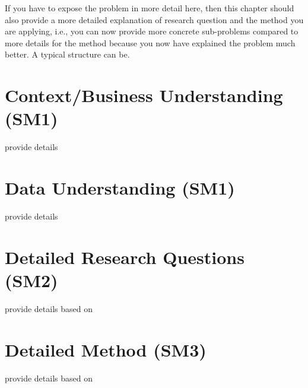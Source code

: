 If you have to expose the problem in more detail here, then this chapter should also provide a more detailed explanation of research question and the method you are applying, i.e., you can now provide more concrete sub-problems compared to  more details for the method  because you now have explained the problem much better.
A typical structure can be.

\section{Context/Business Understanding (SM1)}\label{sec:problem-exposition:context-understanding}

provide details

\section{Data Understanding (SM1)}\label{sec:problem-exposition:data-understanding}

provide details

\section{Detailed Research Questions (SM2)}\label{sec:problem-exposition:research-problems}

provide details based on 

\section{Detailed Method (SM3)}\label{sec:problem-exposition:research-method}

provide details based on 

